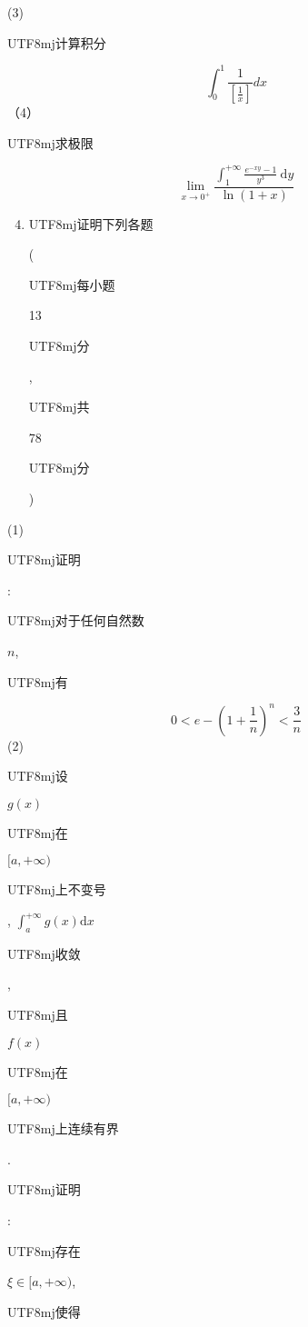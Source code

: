 \documentclass[10pt]{article}
\begin{document}
(3) \begin{CJK}{UTF8}{mj}计算积分\end{CJK}
$$
\int_{0}^{1} \frac{1}{\left[\frac{1}{x}\right]} d x
$$
（4）\begin{CJK}{UTF8}{mj}求极限\end{CJK}
$$
\lim _{x \rightarrow 0^{+}} \frac{\int_{1}^{+\infty} \frac{e^{-x y}-1}{y^{3}} \mathrm{~d} y}{\ln (1+x)}
$$

\begin{enumerate}
  \setcounter{enumi}{3}
  \item \begin{CJK}{UTF8}{mj}证明下列各题\end{CJK} (\begin{CJK}{UTF8}{mj}每小题\end{CJK} 13 \begin{CJK}{UTF8}{mj}分\end{CJK}, \begin{CJK}{UTF8}{mj}共\end{CJK} 78 \begin{CJK}{UTF8}{mj}分\end{CJK})
\end{enumerate}
(1) \begin{CJK}{UTF8}{mj}证明\end{CJK}: \begin{CJK}{UTF8}{mj}对于任何自然数\end{CJK} $n$, \begin{CJK}{UTF8}{mj}有\end{CJK}
$$
0<e-\left(1+\frac{1}{n}\right)^{n}<\frac{3}{n}
$$
(2) \begin{CJK}{UTF8}{mj}设\end{CJK} $g(x)$ \begin{CJK}{UTF8}{mj}在\end{CJK} $[a,+\infty)$ \begin{CJK}{UTF8}{mj}上不变号\end{CJK}, $\int_{a}^{+\infty} g(x) \mathrm{d} x$ \begin{CJK}{UTF8}{mj}收敛\end{CJK}, \begin{CJK}{UTF8}{mj}且\end{CJK} $f(x)$ \begin{CJK}{UTF8}{mj}在\end{CJK} $[a,+\infty)$ \begin{CJK}{UTF8}{mj}上连续有界\end{CJK}. \begin{CJK}{UTF8}{mj}证明\end{CJK}: \begin{CJK}{UTF8}{mj}存在\end{CJK} $\xi \in[a,+\infty)$, \begin{CJK}{UTF8}{mj}使得\end{CJK}
\end{document}

